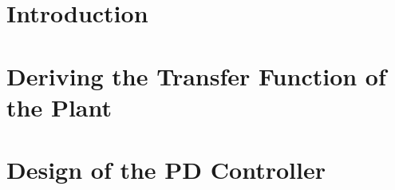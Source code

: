 \documentclass[titlepage, a4paper, 11pt]{article}
\begin{document}


\newpage
\tableofcontents
\newpage

\section{Introduction}


\newpage
\section{Deriving the Transfer Function of the Plant}


\newpage
\section{Design of the PD Controller}




\printbibliography
\end{document}
